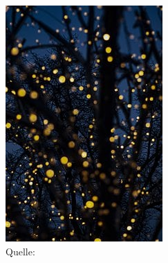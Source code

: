 \begin{figure}[!htbp]
    \begin{subfigure}[t]{0.3\textwidth}
        \includegraphics[width=\textwidth]{images/mult0.jpg}
        \caption*{Quelle: \cite{bib:vodafone-legt-in-pirmasens}}
        \label{fig:light-points-on-dark-bg}
    \end{subfigure}
    \hfill
    \begin{subfigure}[t]{0.3\textwidth}

\end{subfigure}
\end{figure}
